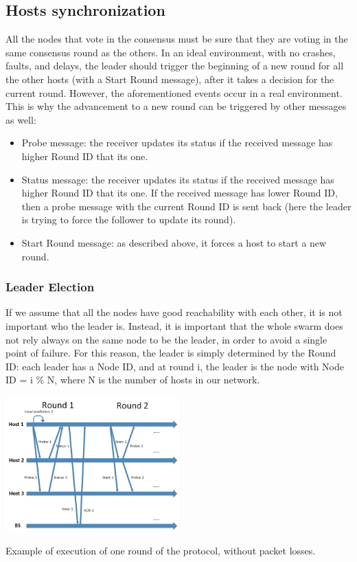 \documentclass[10pt,conference,compsocconf]{IEEEtran}
\begin{document}
\subsection{Hosts synchronization}All the nodes that vote in the consensus must be sure that they are voting in the same consensus round as the others. In an ideal environment, with no crashes, faults, and delays, the leader should trigger the beginning of a new round for all the other hosts (with a Start Round message), after it takes a decision for the current round. However, the aforementioned events occur in a real environment. This is why the advancement to a new round can be triggered by other messages as well:
\begin{itemize}
\item Probe message: the receiver updates its status if the received message has higher Round ID that its one.
\item Status message: the receiver updates its status if the received message has higher Round ID that its one. If the received message has lower Round ID, then a probe message with the current Round ID is sent back (here the leader is trying to force the follower to update its round).
\item Start Round message: as described above, it forces a host to start a new round.
\end{itemize}
\subsubsection*{Leader Election}
If we assume that all the nodes have good reachability with each other, it is not important who the leader is. Instead, it is important that the whole swarm does not rely always on the same node to be the leader, in order to avoid a single point of failure. For this reason, the leader is simply determined by the Round ID: each leader has a Node ID, and at round i, the leader is the node with Node ID = i \% N, where N is the number of hosts in our network.
\begin{center}
	\captionsetup{type=figure}
	\includegraphics[width=0.5\textwidth]{img/temporal_sketch.jpg}
	\caption {Example of execution of one round of the protocol, without packet losses.}
	\label{fig:person_FP_FN}
\end{center}
\end{document}
